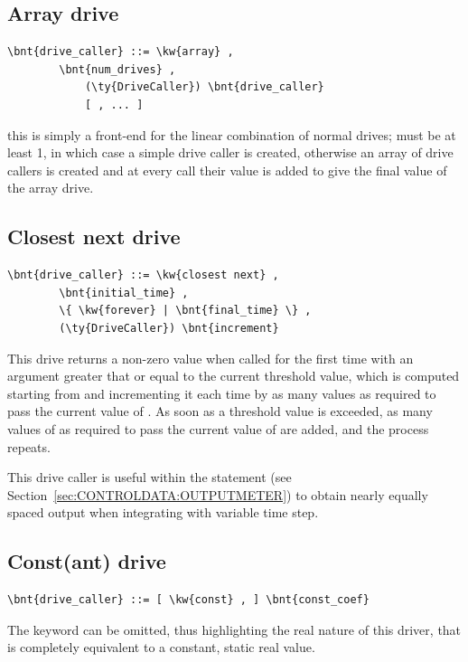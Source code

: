 \subsection{Array drive}
\begin{Verbatim}[commandchars=\\\{\}]
    \bnt{drive_caller} ::= \kw{array} ,
        \bnt{num_drives} ,
            (\ty{DriveCaller}) \bnt{drive_caller}
            [ , ... ]
\end{Verbatim}
this is simply a front-end for the linear combination of  
normal drives;  must be at least 1, in which case 
a simple drive caller is created, otherwise an array of drive callers 
is created and at every call their value is added to give 
the final value of the array drive.

\subsection{Closest next drive}
\label{sec:DRIVE:CLOSEST_NEXT}
\begin{Verbatim}[commandchars=\\\{\}]
    \bnt{drive_caller} ::= \kw{closest next} ,
        \bnt{initial_time} ,
        \{ \kw{forever} | \bnt{final_time} \} ,
        (\ty{DriveCaller}) \bnt{increment}
\end{Verbatim}
This drive returns a non-zero value when called for the first time
with an argument greater that or equal to the current threshold value,
which is computed starting from  and incrementing
it each time by as many  values as required to pass
the current value of .
As soon as a threshold value is exceeded, as many values of 
as required to pass the current value of  are added,
and the process repeats.

This drive caller is useful within the  statement
(see Section~\ref{sec:CONTROLDATA:OUTPUTMETER})
to obtain nearly equally spaced output when integrating
with variable time step.

\subsection{Const(ant) drive}
\begin{Verbatim}[commandchars=\\\{\}]
    \bnt{drive_caller} ::= [ \kw{const} , ] \bnt{const_coef}
\end{Verbatim}
The keyword  can be omitted, thus highlighting the real nature
of this driver, that is completely equivalent to a constant, static real
value.

